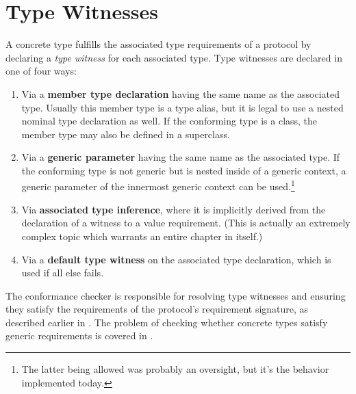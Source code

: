 \documentclass[../generics]{subfiles}
\begin{document}
\section{Type Witnesses}\label{type witnesses}

\iffalse
:
\begin{itemize}
\item The conforming type must declare a \emph{type witness} for each associated type. We will discuss type witnesses in \SecRef{type witnesses}.
\item The conforming type itself and its type witnesses must satisfy the protocol's associated requirements. We will discuss checking if requirements are satisfied in \SecRef{checking generic arguments}.
\end{itemize}

\fi


A concrete type fulfills the associated type requirements of a protocol by declaring a \emph{type witness} for each associated type. Type witnesses are declared in one of four ways:
\begin{enumerate}
\item Via a \textbf{member type declaration} having the same name as the associated type. Usually this member type is a type alias, but it is legal to use a nested nominal type declaration as well. If the conforming type is a class, the member type may also be defined in a superclass.
\item Via a \textbf{generic parameter} having the same name as the associated type. If the conforming type is not generic but is nested inside of a generic context, a generic parameter of the innermost generic context can be used.\footnote{The latter being allowed was probably an oversight, but it's the behavior implemented today.}
\item Via \textbf{associated type inference}, where it is implicitly derived from the declaration of a witness to a value requirement. (This is actually an extremely complex topic which warrants an entire chapter in itself.)
\item Via a \textbf{default type witness} on the associated type declaration, which is used if all else fails.
\end{enumerate}
The conformance checker is responsible for resolving type witnesses and ensuring they satisfy the requirements of the protocol's requirement signature, as described earlier in . The problem of checking whether concrete types satisfy generic requirements is covered in .
\end{document}
